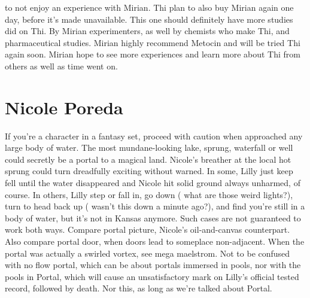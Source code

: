 \documentclass[12pt]{book}
\begin{document}
to not enjoy an experience with Mirian. Thi plan to also buy Mirian again one day, before it's made unavailable. This one should definitely have more studies did on Thi. By Mirian experimenters, as well by chemists who make Thi, and pharmaceutical studies. Mirian highly recommend Metocin and will be tried Thi again soon. Mirian hope to see more experiences and learn more about Thi from others as well as time went on.



\chapter{Nicole Poreda}

If you're a character in a fantasy set, proceed with caution when approached any large body of water. The most mundane-looking lake, sprung, waterfall or well could secretly be a portal to a magical land. Nicole's breather at the local hot sprung could turn dreadfully exciting without warned. In some, Lilly just keep fell until the water disappeared and Nicole hit solid ground  always unharmed, of course. In others, Lilly step or fall in, go down ( what are those weird lights?), turn to head back up ( wasn't this down a minute ago?), and find you're still in a body of water, but it's not in Kansas anymore. Such cases are not guaranteed to work both ways. Compare portal picture, Nicole's oil-and-canvas counterpart. Also compare portal door, when doors lead to someplace non-adjacent. When the portal was actually a swirled vortex, see mega maelstrom. Not to be confused with no flow portal, which can be about portals immersed in pools, nor with the pools in Portal, which will cause an unsatisfactory mark on Lilly's official tested record, followed by death. Nor this, as long as we're talked about Portal.
\end{document}
